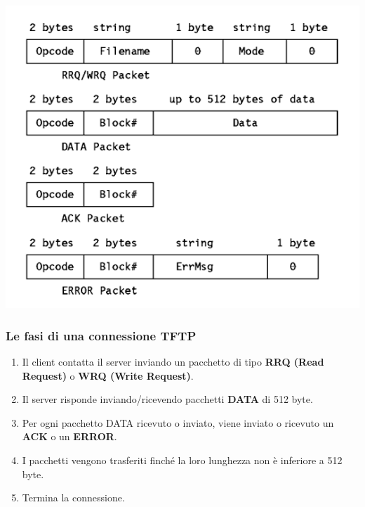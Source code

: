         \begin{center}
            \includegraphics[scale=0.4]{chapters/6/assets/schema_a.png}
        \end{center}

        \subsubsection{Le fasi di una connessione TFTP}
            \begin{enumerate}
                \item Il client contatta il server inviando un pacchetto di tipo \textbf{RRQ (Read Request)} o \textbf{WRQ (Write Request)}.
                \item Il server risponde inviando/ricevendo pacchetti \textbf{DATA} di 512 byte.
                \item Per ogni pacchetto DATA ricevuto o inviato, viene inviato o ricevuto un \textbf{ACK} o un \textbf{ERROR}.
                \item I pacchetti vengono trasferiti finché la loro lunghezza non è inferiore a 512 byte.
                \item Termina la connessione.
            \end{enumerate}

